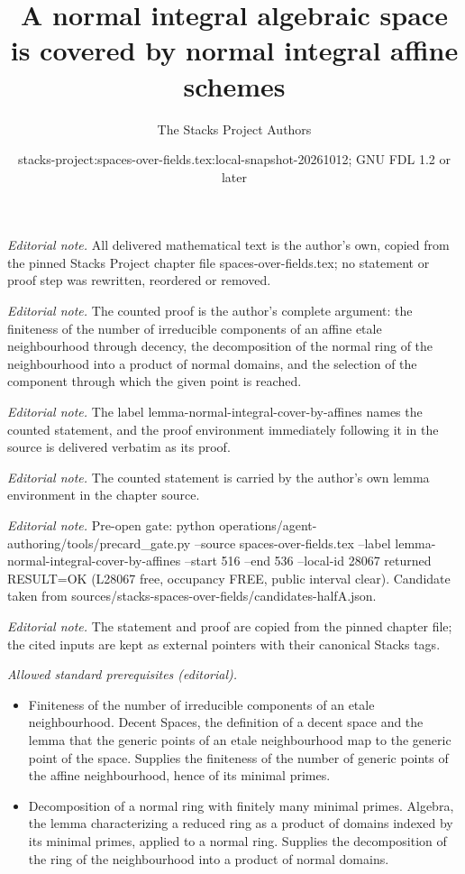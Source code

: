 \documentclass[10pt,a4paper]{amsart}
\title{A normal integral algebraic space is covered by normal integral affine schemes}
\author{The Stacks Project Authors}
\date{stacks-project:spaces-over-fields.tex:local-snapshot-20261012; GNU FDL 1.2 or later}
\theoremstyle{plain}
\theoremstyle{definition}
\theoremstyle{remark}
\numberwithin{equation}{subsection}
\begin{document}
\maketitle
\noindent\textit{Editorial note.} All delivered mathematical text is the author's own, copied from the pinned Stacks Project chapter file spaces-over-fields.tex; no statement or proof step was rewritten, reordered or removed.\par\medskip
\noindent\textit{Editorial note.} The counted proof is the author's complete argument: the finiteness of the number of irreducible components of an affine etale neighbourhood through decency, the decomposition of the normal ring of the neighbourhood into a product of normal domains, and the selection of the component through which the given point is reached.\par\medskip
\noindent\textit{Editorial note.} The label lemma-normal-integral-cover-by-affines names the counted statement, and the proof environment immediately following it in the source is delivered verbatim as its proof.\par\medskip
\noindent\textit{Editorial note.} The counted statement is carried by the author's own lemma environment in the chapter source.\par\medskip
\noindent\textit{Editorial note.} Pre-open gate: python operations/agent-authoring/tools/precard\_gate.py --source spaces-over-fields.tex --label lemma-normal-integral-cover-by-affines --start 516 --end 536 --local-id 28067 returned RESULT=OK (L28067 free, occupancy FREE, public interval clear). Candidate taken from sources/stacks-spaces-over-fields/candidates-halfA.json.\par\medskip
\noindent\textit{Editorial note.} The statement and proof are copied from the pinned chapter file; the cited inputs are kept as external pointers with their canonical Stacks tags.\par\medskip
\noindent\textit{Allowed standard prerequisites (editorial).}\begin{itemize}
\item Finiteness of the number of irreducible components of an etale neighbourhood. Decent Spaces, the definition of a decent space and the lemma that the generic points of an etale neighbourhood map to the generic point of the space. Supplies the finiteness of the number of generic points of the affine neighbourhood, hence of its minimal primes.
\item Decomposition of a normal ring with finitely many minimal primes. Algebra, the lemma characterizing a reduced ring as a product of domains indexed by its minimal primes, applied to a normal ring. Supplies the decomposition of the ring of the neighbourhood into a product of normal domains.
\end{itemize}\medskip
\end{document}
